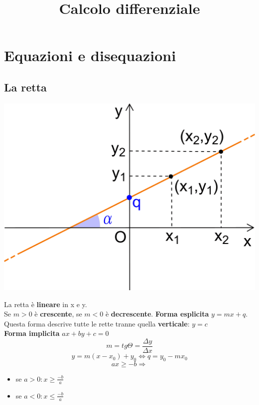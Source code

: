 \documentclass{report}
\title{Calcolo differenziale}
\begin{document}
\maketitle
\tableofcontents

\newpage
\section{Equazioni e disequazioni}
    \subsection{La retta}
        \begin{center}
            \includegraphics[width=\textwidth]{retta.png}
        \end{center}
        La retta è \textbf{lineare} in x e y. \\
        Se $ m > 0 $ è \textbf{crescente}, se $ m < 0 $ è \textbf{decrescente}.
        \textbf{Forma esplicita} $ y = mx + q $. \\
        Questa forma descrive tutte le rette tranne quella \textbf{verticale}: $ y = c $ \\
        \textbf{Forma implicita} $ ax + by + c = 0 $
        $$ m = tg\Theta = \frac{\Delta y}{\Delta x} $$
        $$ y = m(x - x_0) + y_0 \Longleftrightarrow q = y_0 - mx_0 $$
        $$ ax \geq -b \Longrightarrow $$
        \begin{itemize}
            \item se $a > 0: x \geq \frac{-b}{a} $
            \item se $a < 0: x \leq \frac{-b}{a} $
        \end{itemize}
\end{document}
